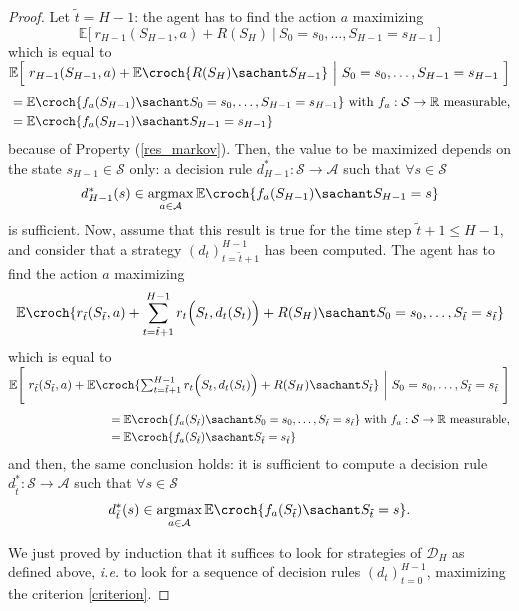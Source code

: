 \begin{proof}
Let $\tilde{t} = H-1$: the agent has to find the action $a$ maximizing
\[ \mathbb{E} \Big[ \ r_{H-1}(S_{H-1},a) + R(S_H) \ \Big\vert \ S_0=s_0, \ldots, S_{H-1} = s_{H-1} \ \Big] \]
which is equal to 
$\displaystyle \mathbb{E} \Big[ \ r_{H-1}(S_{H-1},a) 
+ \mathbb{E} \croch{ R(S_H) \sachant S_{H-1} } \ \Big\vert \ S_0=s_0, \ldots, S_{H-1} = s_{H-1} \ \Big]$
\begin{align*}
& = \mathbb{E} \croch{ f_a(S_{H-1}) \sachant S_0=s_0, \ldots, S_{H-1} = s_{H-1} } 
\mbox{ with } f_a: \mathcal{S} \rightarrow \mathbb{R} \mbox{ measurable,}  \\ 
& = \mathbb{E} \croch{ f_a(S_{H-1}) \sachant S_{H-1} = s_{H-1}}%
\end{align*}
because of Property (\ref{res_markov}).
Then, the value to be maximized depends on the state $s_{H-1} \in \mathcal{S}$ only:
a decision rule $d^*_{H-1}: \mathcal{S} \rightarrow \mathcal{A}$ 
such that $\forall s \in \mathcal{S}$
\[ d^*_{H-1}(s) \in \operatorname*{argmax}_{a \in \mathcal{A}} \mathbb{E} \croch{ f_a(S_{H-1}) \sachant S_{H-1} = s} \] is sufficient.
Now, assume that this result is true for the time step $\tilde{t}+1 \leqslant H-1$,
and consider that a strategy $(d_t)_{t=\tilde{t}+1}^{H-1}$ has been computed.
The agent has to find the action $a$ maximizing
\[ \mathbb{E} \croch{ r_{\tilde{t}}(S_{\tilde{t}},a) + \sum_{t = \tilde{t}+1}^{H-1} r_{t}\Big(S_{t},d_t(S_t)\Big) + R(S_H) \sachant S_0=s_0, \ldots, S_{\tilde{t}} = s_{\tilde{t}} } \]
which is equal to
$\mathbb{E} \Bigg[ \ r_{\tilde{t}}(S_{\tilde{t}},a) + \mathbb{E} \croch{ \sum_{t = \tilde{t}+1}^{H-1} r_t\Big(S_{t},d_t(S_t)\Big) + R(S_H) \sachant  S_{\tilde{t}} } 
\ \bigg\vert \ S_0=s_0, \ldots, S_{\tilde{t}} = s_{\tilde{t}} \ \Bigg]$
\begin{align*}
\hspace{3cm} & = \mathbb{E} \croch{ f_a(S_{\tilde{t}}) \sachant S_0=s_0, \ldots, S_{\tilde{t}} = s_{\tilde{t}} } 
\mbox{ with } f_a: \mathcal{S} \rightarrow \mathbb{R} \mbox{ measurable,}  \\ 
& = \mathbb{E} \croch{ f_a(S_{\tilde{t}}) \sachant S_{\tilde{t}} = s_{\tilde{t}}} 
\end{align*}
and then, the same conclusion holds:
it is sufficient to compute a decision rule 
$d^*_{\tilde{t}}: \mathcal{S} \rightarrow \mathcal{A}$ 
such that $\forall s \in \mathcal{S}$
\[ d^*_{\tilde{t}}(s) \in \operatorname*{argmax}_{a \in \mathcal{A}} \mathbb{E} \croch{ f_a(S_{\tilde{t}}) \sachant S_{\tilde{t}} = s}. \]

We just proved by induction that it suffices to look for
strategies of $\mathcal{D}_H$ as defined above, 
\textit{i.e.} to look for a sequence of decision rules $(d_t)_{t=0}^{H-1}$,
maximizing the criterion \ref{criterion}.


\end{proof}
